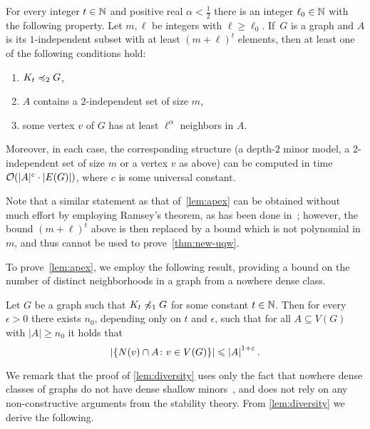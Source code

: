 \begin{lemma}\label{lem:apex}
For every integer $t\in \mathbb{N}$ and positive real $\alpha<\frac 1 2$ 
there is an integer $\ell_0\in\mathbb{N}$ with the following property.
Let $m,\ell$ be integers with $\ell\ge \ell_0$. 
If~$G$ is a graph and $A$ is its $1$-independent subset
with at least $(m+\ell)^{t}$ elements,
then at least one of the following conditions hold:
\begin{enumerate}
  \item $K_t\preccurlyeq_{2} G$,
\item  $A$ contains a $2$-independent set of size $m$, 
\item  some vertex $v$ of $G$
has at least $\ell^{\alpha}$ neighbors in $A$.
\end{enumerate}
Moreover, in each case, the corresponding structure (a depth-$2$ minor model, a $2$-independent set of size $m$ or a vertex $v$ as above) can be computed in time $\mathcal{O}(|A|^c\cdot |E(G)|)$, where $c$  is some universal constant.
\end{lemma}

Note that a similar statement as that of~\cref{lem:apex}
can be obtained without much effort by employing Ramsey's theorem, as has been done in~\cite{nevsetvril2011nowhere}; however, the bound $(m+\ell)^t$ above is then replaced by a bound which is not polynomial in $m$, and  thus cannot be used to prove~\cref{thm:new-uqw}.

\medskip
To prove~\cref{lem:apex}, we employ the following result,
providing a bound on the number of distinct neighborhoods in a graph from a nowhere dense class.

\begin{lemma}\label{lem:diversity}
Let $G$ be a graph such that $K_t\not\preccurlyeq_{1} G$ for some constant $t\in \mathbb{N}$. 
Then for every $\epsilon>0$ there exists $n_0$, depending only on $t$ and $\epsilon$, such that for all $A\subseteq V(G)$ with $|A|\geq n_0$ it holds that
\[\left\lvert\{N(v)\cap A \colon v\in V(G)\}\right\rvert\leqslant\left\lvert A\right\rvert^{1+\varepsilon}.\]
\end{lemma}



We remark that the proof of \cref{lem:diversity} uses only the fact that
nowhere dense classes of graphs do not have dense 
shallow minors~\cite{dvorak2007asymptotical,jiang2011compact}, and does not rely on any non-constructive arguments from the stability theory.
From \cref{lem:diversity} we derive the following.

